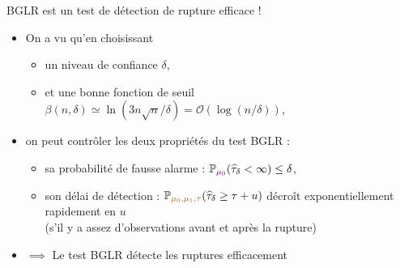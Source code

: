 \documentclass[11pt,french,ignorenonframetext,]{beamer}
\providecommand{\tightlist}{%
  \setlength{\itemsep}{0pt}\setlength{\parskip}{0pt}}
\begin{document}
\begin{frame}{BGLR est un test de détection de rupture efficace \dCooley{} !}

  \begin{itemize}
    \item
    On a vu qu'en choisissant
    \begin{itemize}\tightlist
      \item
      un niveau de confiance $\delta$,
      \item
      et une bonne fonction de seuil $\beta(n,\delta) \simeq \ln(3n \sqrt{n}/\delta) = \mathcal{O}(\log(n/\delta))$,
    \end{itemize}
    \pause
    \vspace*{10pt}
    \item
    on peut contrôler les deux propriétés du test BGLR :
    \begin{itemize}\tightlist
      \item
        sa \alert{probabilité de fausse alarme} :
        $\mathbb{P}_{\textcolor{darkpurple}{\mu_0}}(\widehat{\tau}_\delta < \infty) \leq \delta$,
      \item
        son \alert{délai de détection} :
        $\mathbb{P}_{\textcolor{gold}{\mu_0,\mu_1,\tau}} (\widehat{\tau}_{\delta} \geq \tau + u)$ décroît exponentiellement rapidement en $u$ \\
        (s'il y a assez d'observations avant et après la rupture)
    \end{itemize}

    \vspace*{10pt}
    \item
    $\implies$ Le test BGLR détecte les ruptures efficacement \dCooley{}
  \end{itemize}


\end{frame}


\end{document}
